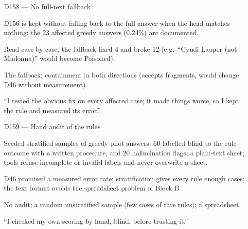 \documentclass[11pt,a4paper]{report}
\begin{document}
\begin{decisionbox}{D158 --- No full-text fallback}
\begin{description}[nosep, leftmargin=0pt]
  \item[Decision.] D156 is kept without falling back to the full answer when the head matches nothing; the 23 affected greedy answers (0.24\%) are documented.
  \item[Why.] Read case by case, the fallback fixed 4 and broke 12 (e.g.\ ``Cyndi Lauper (not Madonna)'' would become Poisoned).
  \item[Alternatives.] The fallback; containment in both directions (accepts fragments, would change D46 without measurement).
  \item[Interview line.] ``I tested the obvious fix on every affected case; it made things worse, so I kept the rule and measured its error.''
\end{description}
\end{decisionbox}

\begin{decisionbox}{D159 --- Hand audit of the rules}
\begin{description}[nosep, leftmargin=0pt]
  \item[Decision.] Seeded stratified samples of greedy pilot answers: 60 labelled blind to the rule outcome with a written procedure, and 20 hallucination flags; a plain-text sheet; tools refuse incomplete or invalid labels and never overwrite a sheet.
  \item[Why.] D46 promised a measured error rate; stratification gives every rule enough cases; the text format avoids the spreadsheet problem of Block B.
  \item[Alternatives.] No audit; a random unstratified sample (few cases of rare rules); a spreadsheet.
  \item[Interview line.] ``I checked my own scoring by hand, blind, before trusting it.''
\end{description}
\end{decisionbox}
\end{document}
